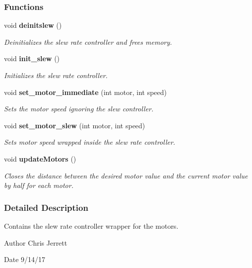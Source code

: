 \subsubsection*{Functions}
\begin{DoxyCompactItemize}
\item 
void \textbf{ deinitslew} ()
\begin{DoxyCompactList}\small\item\em Deinitializes the slew rate controller and frees memory. \end{DoxyCompactList}\item 
void \textbf{ init\+\_\+slew} ()
\begin{DoxyCompactList}\small\item\em Initializes the slew rate controller. \end{DoxyCompactList}\item 
void \textbf{ set\+\_\+motor\+\_\+immediate} (int motor, int speed)
\begin{DoxyCompactList}\small\item\em Sets the motor speed ignoring the slew controller. \end{DoxyCompactList}\item 
void \textbf{ set\+\_\+motor\+\_\+slew} (int motor, int speed)
\begin{DoxyCompactList}\small\item\em Sets motor speed wrapped inside the slew rate controller. \end{DoxyCompactList}\item 
void \textbf{ update\+Motors} ()
\begin{DoxyCompactList}\small\item\em Closes the distance between the desired motor value and the current motor value by half for each motor. \end{DoxyCompactList}\end{DoxyCompactItemize}


\subsubsection{Detailed Description}
Contains the slew rate controller wrapper for the motors. 

\begin{DoxyAuthor}{Author}
Chris Jerrett 
\end{DoxyAuthor}
\begin{DoxyDate}{Date}
9/14/17 
\end{DoxyDate}


